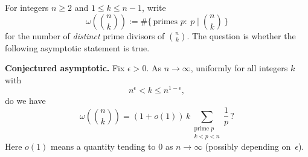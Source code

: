 For integers $n\ge 2$ and $1\le k\le n-1$, write
\[
\omega\!\left(\binom{n}{k}\right):=\#\{\,\text{primes }p:\ p\mid \binom{n}{k}\,\}
\]
for the number of \emph{distinct} prime divisors of $\binom{n}{k}$.
The question is whether the following asymptotic statement is true.

\medskip
\noindent\textbf{Conjectured asymptotic.}
Fix $\epsilon>0$. As $n\to\infty$, uniformly for all integers $k$ with
\[
n^\epsilon<k\le n^{1-\epsilon},
\]
do we have
\[
\omega\!\left(\binom{n}{k}\right)
=(1+o(1))\,k\sum_{\substack{\text{prime }p\\ k<p<n}}\frac1p\,?
\]
Here $o(1)$ means a quantity tending to $0$ as $n\to\infty$ (possibly depending on~$\epsilon$).

